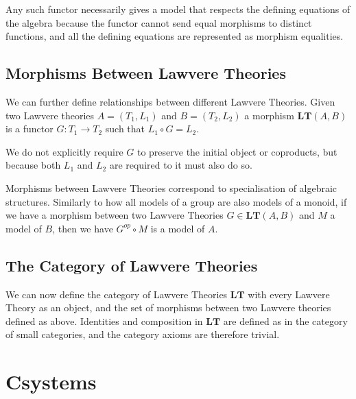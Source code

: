 \documentclass[12pt,a4paper,twoside,openright]{report}
\newcommand{\catname}[1]{\mathbf{#1}}
\begin{document}
Any such functor necessarily gives a model that respects the defining equations
of the algebra because the functor cannot send equal morphisms to distinct
functions, and all the defining equations are represented as morphism
equalities.

\subsection{Morphisms Between Lawvere Theories}
We can further define relationships between different Lawvere Theories. Given
two Lawvere theories $A = (T_1, L_1)$ and $B = (T_2, L_2)$ a morphism
$\catname{LT}(A, B)$ is a functor $G: T_1\to T_2$ such that $L_1\circ G = L_2$.

We do not explicitly require $G$ to preserve the initial object or coproducts,
but because both $L_1$ and $L_2$ are required to it must also do so.

Morphisms between Lawvere Theories correspond to specialisation of algebraic
structures. Similarly to how all models of a group are also models of a monoid,
if we have a morphism between two Lawvere Theories $G\in \catname{LT}(A, B)$ and
$M$ a model of $B$, then we have $G^{op}\circ M$ is a model of $A$.

\subsection{The Category of Lawvere Theories}
We can now define the category of Lawvere Theories $\catname{LT}$ with every
Lawvere Theory as an object, and the set of morphisms between two Lawvere
theories defined as above. Identities and composition in $\catname{LT}$ are
defined as in the category of small categories, and the category axioms are
therefore trivial.

\section{Csystems}
\end{document}
